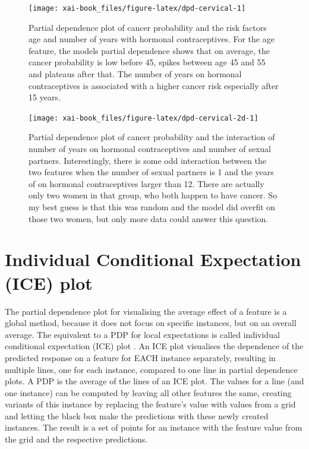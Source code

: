 \documentclass[12pt,]{krantz}
\theoremstyle{definition}
\theoremstyle{definition}
\theoremstyle{definition}
\theoremstyle{remark}
\begin{document}
\begin{figure}

{\centering \texttt{[image: xai-book\_files/figure-latex/dpd-cervical-1]} 

}

\caption{Partial dependence plot of cancer probability and the risk factors age and number of years with hormonal contraceptives. For the age feature, the models partial dependence shows that on average, the cancer probability is low before 45, spikes between age 45 and 55 and plateaus after that. The number of years on hormonal contraceptives is associated with a higher cancer risk especially after 15 years.}\label{fig:dpd-cervical}
\end{figure}

\begin{figure}

{\centering \texttt{[image: xai-book\_files/figure-latex/dpd-cervical-2d-1]} 

}

\caption{Partial dependence plot of cancer probability and the interaction of number of years on hormonal contraceptives and number of sexual partners. Interestingly, there is some odd interaction between the two features when the number of sexual partners is 1 and the years of on hormonal contraceptives larger than 12. There are actually only two women in that group, who both happen to have cancer. So my best guess is that this was random and the model did overfit on those two women, but only more data could answer this question.}\label{fig:dpd-cervical-2d}
\end{figure}

\section{Individual Conditional Expectation (ICE)
plot}\label{individual-conditional-expectation-ice-plot}

The partial dependence plot for visualising the average effect of a
feature is a global method, because it does not focus on specific
instances, but on an overall average. The equivalent to a PDP for local
expectations is called individual conditional expectation (ICE) plot
\citep{goldstein2015peeking}. An ICE plot visualises the dependence of
the predicted response on a feature for EACH instance separately,
resulting in multiple lines, one for each instance, compared to one line
in partial dependence plots. A PDP is the average of the lines of an ICE
plot. The values for a line (and one instance) can be computed by
leaving all other features the same, creating variants of this instance
by replacing the feature's value with values from a grid and letting the
black box make the predictions with these newly created instances. The
result is a set of points for an instance with the feature value from
the grid and the respective predictions.
\end{document}
